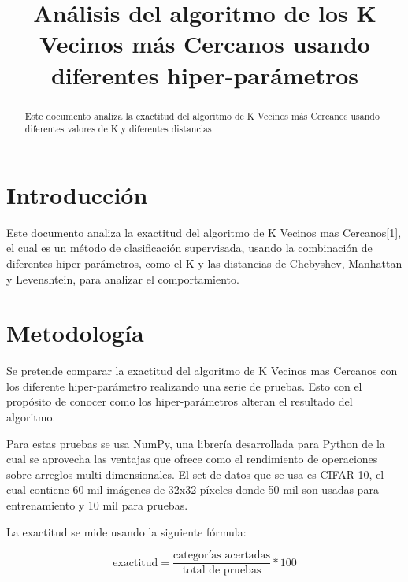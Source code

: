 \documentclass[conference]{IEEEtran}
\begin{document}
\title{Análisis del algoritmo de los K Vecinos más Cercanos usando diferentes hiper-parámetros}

\author{
}

\maketitle

\begin{abstract}
Este documento analiza la exactitud del algoritmo de K Vecinos más Cercanos usando diferentes valores de K y diferentes distancias.
\end{abstract}

\IEEEpeerreviewmaketitle



\section{Introducción}
Este documento analiza la exactitud del algoritmo de K Vecinos mas Cercanos[1], el cual es un método de clasificación supervisada, usando la combinación de diferentes hiper-parámetros, como el K y las distancias de Chebyshev, Manhattan y Levenshtein, para analizar el comportamiento.

\section{Metodología}

Se pretende comparar la exactitud del algoritmo de K Vecinos mas Cercanos con los diferente hiper-parámetro realizando una serie de pruebas. Esto con el propósito de conocer como los hiper-parámetros alteran el resultado del algoritmo.

Para estas pruebas se usa NumPy, una librería desarrollada para Python de la cual se aprovecha las ventajas que ofrece como el rendimiento de operaciones sobre arreglos multi-dimensionales. El set de datos que se usa es CIFAR-10, el cual contiene 60 mil imágenes de 32x32 píxeles donde 50 mil son usadas para entrenamiento y 10 mil para pruebas.

La exactitud se mide usando la siguiente fórmula:

\[ \textrm{exactitud} = \frac{\textrm{categorías acertadas}}{\textrm{total de pruebas}} * \textrm{100} \]
\end{document}
